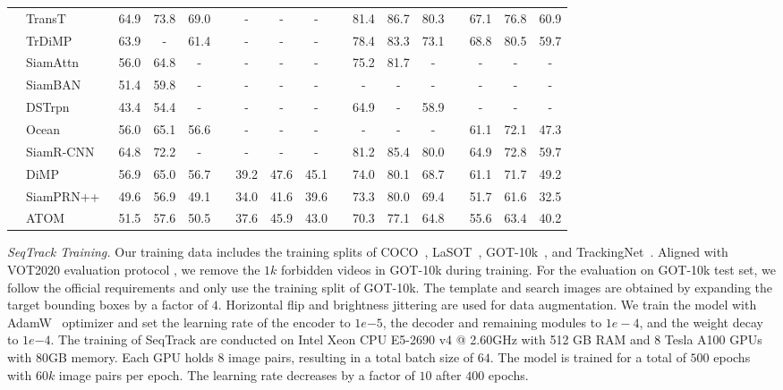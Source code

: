 \begin{table*}
{{\begin{tabular}{l|l| ccc c ccc c ccc c ccc}
    &TransT~\cite{transt}	&64.9	&73.8	&69.0 & &- &- &- & &81.4	&86.7	&80.3 &	&67.1	&76.8	&60.9\\
    &TrDiMP~\cite{TMT}  	&63.9	&-	&61.4 & &- &- &- &	&78.4	&83.3 	&73.1	&	&68.8	&80.5	&59.7\\
    &SiamAttn~\cite{SiamAtt}  	&56.0	&64.8	&- & &- &- &- &	&75.2	&81.7	&-	&	&-	&-	&-\\
    &SiamBAN~\cite{SiamBAN}  	&51.4	&59.8	&- & &- &- &- &	&-	&- 	&-	&	&-	&-	&-\\
    &DSTrpn~\cite{DSTrpn}	&43.4	&54.4	&- & &- &- &-	& &64.9	&-	&58.9 &	&-	&-	&-\\
    &Ocean~\cite{Ocean}	&56.0	&65.1	&56.6 & &- &- &-	& &-	&-	&- &	&61.1	&72.1	&47.3\\
    &SiamR-CNN~\cite{SiamRCNN}  	&64.8	&72.2	&- &	&- &- &- & &81.2	&85.4	&80.0	&	&64.9	&72.8	&59.7\\
    &DiMP~\cite{DiMP}	   	&56.9	&65.0	&56.7 &	&39.2 &47.6 &45.1 & &74.0	&80.1	&68.7 &	&61.1	&71.7	&49.2\\
    &SiamPRN++~\cite{SiamRPNplusplus}	&49.6	&56.9	&49.1 & &34.0 &41.6 &39.6 &	&73.3	&80.0	&69.4 &	&51.7	&61.6	&32.5\\
    &ATOM~\cite{ATOM}	   	&51.5	&57.6	&50.5 &	&37.6 &45.9 &43.0 & &70.3	&77.1	&64.8	& &55.6	&63.4	&40.2\\
  \bottomrule
\end{tabular}
}}
  \vspace{-4mm}
\end{table*}

\textit{SeqTrack Training.} 
Our training data includes the training splits of COCO~\cite{COCO}, LaSOT~\cite{LaSOT}, GOT-10k~\cite{GOT10K}, and TrackingNet~\cite{trackingnet}. Aligned with VOT2020 evaluation protocol \cite{vot2020}, we remove the $1k$ forbidden videos in GOT-10k during training. For the evaluation on GOT-10k test set, we follow the official requirements \cite{GOT10K} and only use the training split of GOT-10k. 
The template and search images are obtained by expanding the target bounding boxes by a factor of $4$. Horizontal flip and brightness jittering are used for data augmentation. We train the model with AdamW~\cite{AdamW} optimizer and set the learning rate of the encoder to $1$$e$$-5$, the decoder and remaining modules to $1$$e-$$4$, and the weight decay to $1$$e$$-4$. The training of SeqTrack are conducted on Intel Xeon CPU E5-2690 v4 @ 2.60GHz with 512 GB RAM and 8 Tesla A100 GPUs with 80GB memory. Each GPU holds $8$ image pairs, resulting in a total batch size of $64$. The model is trained for a total of $500$ epochs with $60k$ image pairs per epoch. The learning rate decreases by a factor of $10$ after $400$ epochs. 

